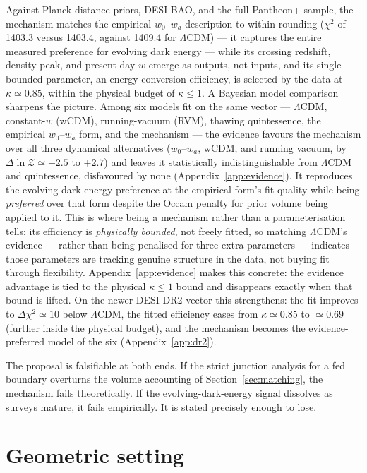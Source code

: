 \documentclass[11pt,a4paper]{article}
\newcommand{\lcdm}{\ensuremath{\Lambda}CDM}
\begin{document}
Against Planck distance priors, DESI BAO, and the full Pantheon+ sample, the mechanism matches the empirical $w_0$--$w_a$ description to within rounding ($\chi^2$ of 1403.3 versus 1403.4, against 1409.4 for \lcdm{}) --- it captures the entire measured preference for evolving dark energy --- while its crossing redshift, density peak, and present-day $w$ emerge as outputs, not inputs, and its single bounded parameter, an energy-conversion efficiency, is selected by the data at $\kappa\simeq0.85$, within the physical budget of $\kappa\le1$. A Bayesian model comparison sharpens the picture. Among six models fit on the same vector --- \lcdm{}, constant-$w$ (wCDM), running-vacuum (RVM), thawing quintessence, the empirical $w_0$--$w_a$ form, and the mechanism --- the evidence favours the mechanism over all three dynamical alternatives ($w_0$--$w_a$, wCDM, and running vacuum, by $\Delta\ln\mathcal{Z}\simeq+2.5$ to $+2.7$) and leaves it statistically indistinguishable from \lcdm{} and quintessence, disfavoured by none (Appendix~\ref{app:evidence}). It reproduces the evolving-dark-energy preference at the empirical form's fit quality while being \emph{preferred} over that form despite the Occam penalty for prior volume being applied to it. This is where being a mechanism rather than a parameterisation tells: its efficiency is \emph{physically bounded}, not freely fitted, so matching \lcdm{}'s evidence --- rather than being penalised for three extra parameters --- indicates those parameters are tracking genuine structure in the data, not buying fit through flexibility. Appendix~\ref{app:evidence} makes this concrete: the evidence advantage is tied to the physical $\kappa\le1$ bound and disappears exactly when that bound is lifted. On the newer DESI DR2 vector this strengthens: the fit improves to $\Delta\chi^2\simeq10$ below \lcdm{}, the fitted efficiency eases from $\kappa\simeq0.85$ to $\simeq0.69$ (further inside the physical budget), and the mechanism becomes the evidence-preferred model of the six (Appendix~\ref{app:dr2}).

The proposal is falsifiable at both ends. If the strict junction analysis for a fed boundary overturns the volume accounting of Section~\ref{sec:matching}, the mechanism fails theoretically. If the evolving-dark-energy signal dissolves as surveys mature, it fails empirically. It is stated precisely enough to lose.

\section{Geometric setting}\label{sec:setting}
\end{document}
